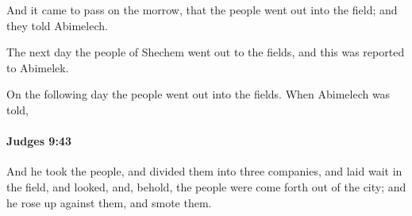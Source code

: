 			\begin{versebox}
					\item[BHS] 
					\item[ASV] And it came to pass on the morrow, that the people went out into the field; and they told Abimelech.
					\item[NIV] The next day the people of Shechem went out to the fields, and this was reported to Abimelek.
					\item[NRSV] On the following day the people went out into the fields. When Abimelech was told,
			\end{versebox}

		\paragraph{Judges 9:43} %
			\label{JUDGES-9-43}

			And he took the people, and divided them into three companies, and laid wait in the field, and looked, and, behold, the people were come forth out of the city; and he rose up against them, and smote them.

